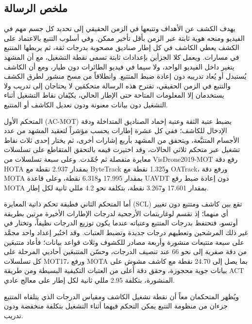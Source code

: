 \documentclass[12pt,a4paper]{article}
\begin{document}
\begin{otherlanguage}{arabic}
\section*{\LARGE ملخص الرسالة}
\thispagestyle{empty}

يهدف الكشف عن الأهداف وتتبعها في الزمن الحقيقي إلى تحديد كل جسم مهم في الفيديو ومنحه هوية ثابتة عبر الزمن بأقل تأخير ممكن. وفي أسلوب التتبع بالاعتماد على الكشف يعطي الكاشف في كل إطار صناديق مصحوبة بدرجات ثقة، ثم يربطها المتتبع في مسارات. ويعمل كلا الجزأين بإعدادات ثابتة تسمى نقطة التشغيل، مع أن المشهد يتغير داخل الفيديو الواحد، ولا سيما في فيديو الطائرات دون طيار، ومع أن الكاشف يُستبدل أو يُعاد تدريبه دون إعادة ضبط المتتبع. وانطلاقاً من مسح منشور لطرق الكشف والتتبع في الزمن الحقيقي، تقترح هذه الرسالة متحكمَين لا يحتاجان إلى تدريب ولا يستخدمان إلا المعلومات المتاحة حتى الإطار الحالي، يكيّفان نقاط التشغيل أثناء التشغيل دون بيانات معنونة ودون تعديل الكاشف أو المتتبع.

المتحكم الأول (\foreignlanguage{english}{AC-MOT}) يضبط عتبة الثقة وعتبة إخماد الصناديق المتداخلة ودقة الإدخال للكاشف؛ ففي كل عشرة إطارات يحسب مؤشراً لتعقيد المشهد من عدد الأجسام المتتبَّعة، ويتحقق من المشهد بأربع إشارات أخرى، ثم يختار إحدى ثلاث نقاط تشغيل عبر متحكم ثلاثي الحالات، وقد اختيرت قيمه بالتحقق المتقاطع على تسلسلات معايرة منفصلة ثم جُمّدت. وعلى سبعة تسلسلات من \foreignlanguage{english}{VisDrone2019-MOT} رفع دقة \foreignlanguage{english}{HOTA} بمقدار \foreignlanguage{english}{2.937} نقطة مع \foreignlanguage{english}{ByteTrack} و\foreignlanguage{english}{1.325} نقطة مع \foreignlanguage{english}{OATrack}، ورفع دقة \foreignlanguage{english}{MOTA} بمقدار \foreignlanguage{english}{17.995} و\foreignlanguage{english}{6.318} نقطة، وعلى قاعدة \foreignlanguage{english}{UAVDT} دون إعادة ضبط رفع \foreignlanguage{english}{MOTA} بمقدار \foreignlanguage{english}{17.601} و\foreignlanguage{english}{3.267} نقطة، بتكلفة نحو \foreignlanguage{english}{4.2} مللي ثانية لكل إطار.

أما المتحكم الثاني فطبقة تحكم ذاتية المعايرة (\foreignlanguage{english}{SCL}) تقع بين كاشف ومتتبع دون تغيير أي منهما؛ إذ تقسم لوغاريتمات الأرجحية لدرجات الإطارات الأخيرة مرتين بطريقة أوتسو، فتحتفظ بدرجات المتتبع وعتباته عندما يكون توزيع الدرجات نظيفاً، وتختار في غير ذلك المرشحين وتعطيهم درجات جديدة وتضبط العتبات. وقد اختُبر إعداد واحد مجمَّد على سبعة متتبعات منشورة وأربعة مصادر للكشوف وثلاث قواعد بيانات؛ فأعاد متتبعَين من دقة صفرية إلى نحو \foreignlanguage{english}{66} عند تنصيف الدرجات، وحسّن المتتبعَين أحاديي المرحلة على كل تسلسلات \foreignlanguage{english}{MOT17}، ورفع \foreignlanguage{english}{MOTA} بما يصل إلى \foreignlanguage{english}{24.70} نقطة مع كاشف مشوش على بيانات جوية محجوزة، وحقق دقة أعلى من العتبات التكيفية البسيطة ومن طريقة \foreignlanguage{english}{ACT} المنشورة، بتكلفة \foreignlanguage{english}{2.95} مللي ثانية لكل إطار على معالج عادي.

ويُظهر المتحكمان معاً أن نقطة تشغيل الكاشف ومقياس الدرجات الذي يتلقاه المتتبع جزءان من منظومة التتبع يمكن التحكم فيهما أثناء التشغيل بتكلفة منخفضة ودون تدريب.


\clearpage
\end{otherlanguage}
\end{document}
